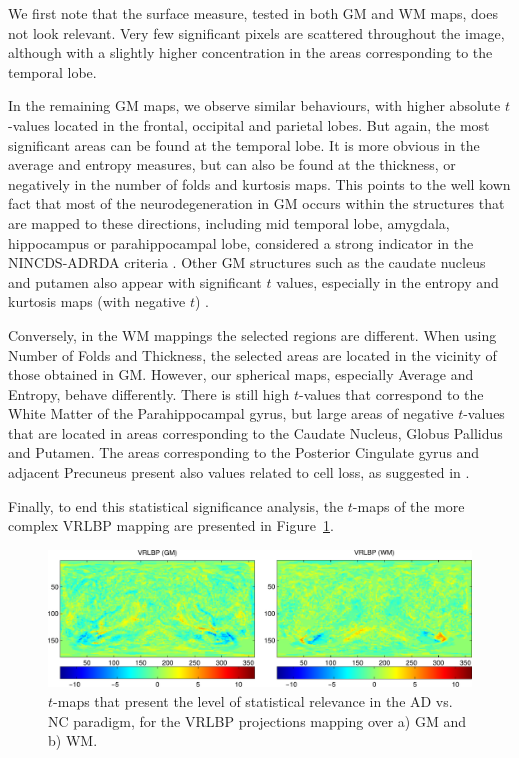 We first note that the surface measure, tested in both \ac{GM} and \ac{WM} maps, does not look relevant. Very few significant pixels are scattered throughout the image, although with a slightly higher concentration in the areas corresponding to the temporal lobe. 

In the remaining \ac{GM} maps, we observe similar behaviours, with higher absolute $t$-values located in the frontal, occipital and parietal lobes. But again, the most significant areas can be found at the temporal lobe. It is more obvious in the average and entropy measures, but can also be found at the thickness, or negatively in the number of folds and kurtosis maps. This points to the well kown fact that most of the neurodegeneration in \ac{GM} occurs within the structures that are mapped to these directions, including mid temporal lobe, amygdala, hippocampus or parahippocampal lobe, considered a strong indicator in the NINCDS-ADRDA criteria \cite{Dubois2007}. Other \ac{GM} structures such as the caudate nucleus and putamen also appear with significant $t$ values, especially in the entropy and kurtosis maps (with negative $t$) \cite{Pievani2013}. 


Conversely, in the \ac{WM} mappings the selected regions are different. When using Number of Folds and Thickness, the selected areas are located in the vicinity of those obtained in \ac{GM}. However, our spherical maps, especially Average and Entropy, behave differently. There is still high $t$-values that correspond to the White Matter of the Parahippocampal gyrus, but large areas of negative $t$-values that are located in areas corresponding to the Caudate Nucleus, Globus Pallidus and Putamen. The areas corresponding to the Posterior Cingulate gyrus and adjacent Precuneus present also values related to cell loss, as suggested in \cite{Baron2001}.

Finally, to end this statistical significance analysis, the $t$-maps of the more complex VRLBP mapping are presented in Figure~\ref{fig:tmapvrlbp}.

\begin{figure}[htp]
	\centering
	\includegraphics[width=\textwidth]{Graphics/ch6/09-tmaps_vrlbp}
	\caption{$t$-maps that present the level of statistical relevance in the AD vs. NC paradigm, for the VRLBP projections mapping over a) \ac{GM} and b) \ac{WM}. }
	\label{fig:tmapvrlbp}
\end{figure}

